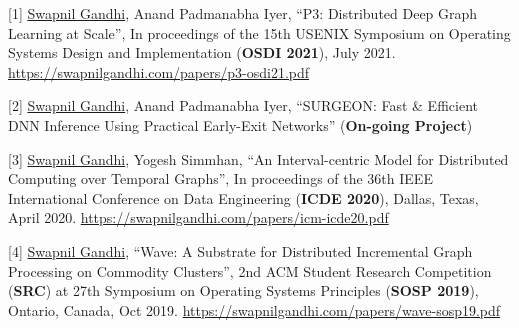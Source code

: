 \documentclass{article}
\begin{document}


[1] \underline{Swapnil Gandhi}, Anand Padmanabha Iyer, ``P3: Distributed Deep Graph Learning at Scale'', In proceedings of the 15th USENIX Symposium on Operating Systems Design and Implementation
(\textbf{OSDI 2021}), July 2021. \url{https://swapnilgandhi.com/papers/p3-osdi21.pdf}

[2] \underline{Swapnil Gandhi}, Anand Padmanabha Iyer, ``SURGEON: Fast \& Efficient DNN Inference Using Practical Early-Exit Networks'' (\textbf{On-going Project})

[3] \underline{Swapnil Gandhi}, Yogesh Simmhan, ``An Interval-centric Model for Distributed Computing over Temporal Graphs'', In proceedings of the 36th IEEE International Conference on Data Engineering
(\textbf{ICDE 2020}), Dallas, Texas, April 2020. \url{https://swapnilgandhi.com/papers/icm-icde20.pdf}

[4] \underline{Swapnil Gandhi}, ``Wave: A Substrate for Distributed Incremental Graph Processing on Commodity Clusters'', 2nd ACM Student Research Competition (\textbf{SRC}) at 27th Symposium on Operating Systems Principles (\textbf{SOSP 2019}), Ontario, Canada, Oct 2019. \url{https://swapnilgandhi.com/papers/wave-sosp19.pdf}
\end{document}
